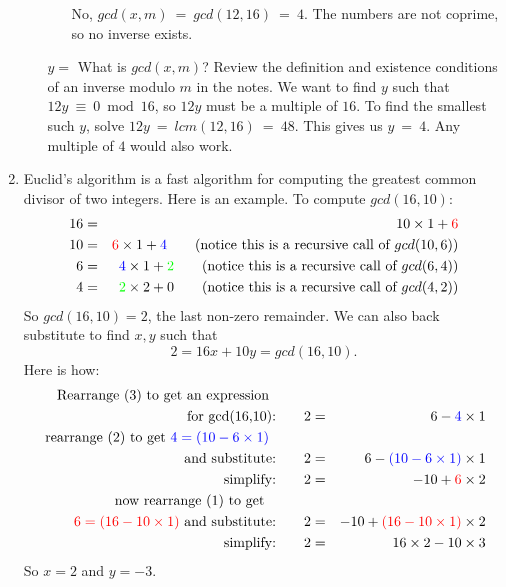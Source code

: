 \documentclass[11pt, preview]{standalone} %
\begin{document}
\begin{enumerate}
\begin{enumerate}
\begin{Choices}
\begin{itemize}
\Solution No, $gcd(x, m)\ =\ gcd(12, 16)\ =\ 4$. The numbers are not coprime, so no inverse exists.
\end{itemize}
\end{Choices}
\begin{Freeform}{4}
$y =$ 
\Hint What is $gcd(x,m)$? Review the definition and existence conditions of an inverse modulo $m$ in the notes.
\Solution We want to find $y$ such that $12 y\ \equiv\ 0 \bmod 16$, so $12 y$ must be a multiple of $16$. To find the smallest such $y$, solve $12 y\ =\ lcm(12, 16)\ =\ 48$. This gives us $y\ =\ 4$. Any multiple of $4$ would also work.  
\end{Freeform}
\end{enumerate}

\item Euclid's algorithm is a fast algorithm for computing the greatest common divisor of two integers. Here is an example. To compute $gcd(16, 10)$:
\begin{eqnarray}
16 &=& 10\times 1 + {\color{red} 6}\\
10 &=& {\color{red} 6} \times 1 + {\color{blue} 4} \qquad (\text{notice this is a recursive call of } gcd(10, 6))\\
6 &=& {\color{blue} 4} \times 1 + {\color{green} 2} \qquad (\text{notice this is a recursive call of } gcd(6, 4))\\
4 &=&  {\color{green} 2} \times 2 + 0 \qquad (\text{notice this is a recursive call of } gcd(4, 2))
\end{eqnarray}
So $gcd(16, 10) = 2$, the last non-zero remainder. We can also back substitute to find $x, y$ such
that $$ 2 = 16x + 10 y = gcd(16,10).$$ Here is how:
\begin{eqnarray*}
\text{ Rearrange (3) to get an expression} \qquad\quad\\
\text{ for gcd(16,10):}\qquad  2&=& 6 - {\color{blue} 4}\times 1 \\
\text{ rearrange (2) to get }  {\color{blue} 4 = (10 - 6\times 1)}\qquad\quad\\ \text{ and substitute:} 
 \qquad 2 &=& 6 - {\color{blue}(10- 6\times 1)}\times 1\\ 
\text{simplify:} \qquad 2 &=& -10 + {\color{red}6} \times 2\\
\text{now rearrange (1) to get }\qquad\quad\\ {\color{red} 6 = (16 - 10\times 1)}\text{ and substitute:} \qquad
2 &=& -10 + {\color{red} (16 - 10\times 1)}\times 2\\ 
\text{simplify:}\qquad2 &=& 16 \times 2 - 10 \times 3
\end{eqnarray*}
So $x = 2$ and $y = -3$. \\


\end{enumerate}
\end{document}
